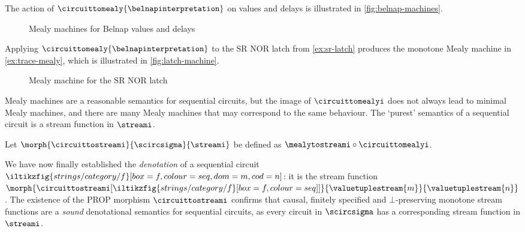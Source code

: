 \documentclass{lmcs}
\begin{document}
\begin{exa}
    The action of \(\circuittomealy{\belnapinterpretation}\) on values and
    delays is illustrated in
    \autoref{fig:belnap-machines}.
\end{exa}

\begin{figure}
    \centering
    

    \vspace{1em}

    
    \caption{
        Mealy machines for Belnap values and delays
    }
    \label{fig:belnap-machines}
\end{figure}

\begin{exa}\label{ex:mealy-translation}
    Applying \(\circuittomealy{\belnapinterpretation}\) to the SR NOR latch from
    \autoref{ex:sr-latch} produces the monotone Mealy machine in
    \autoref{ex:trace-mealy}, which is illustrated in \autoref{fig:latch-machine}.
\end{exa}

\begin{figure}
    \centering
    
    \caption{
        Mealy machine for the SR NOR latch
    }
    \label{fig:latch-machine}
\end{figure}

Mealy machines are a reasonable semantics for sequential circuits, but the
image of \(\circuittomealyi\) does not always lead to minimal Mealy machines,
and there are many Mealy machines that may correspond to the same behaviour.
The `purest' semantics of a sequential circuit is a stream function in
\(\streami\).

\begin{defi}
    Let \(\morph{\circuittostreami}{\scircsigma}{\streami}\) be defined as
    \(\mealytostreami \circ \circuittomealyi\).
\end{defi}

We have now finally established the \emph{denotation} of a sequential circuit \(
\iltikzfig{strings/category/f}[box=f,colour=seq,dom=m,cod=n]
\): it is the stream function \(
\morph{\circuittostreami[\iltikzfig{strings/category/f}[box=f,colour=seq]]}{\valuetuplestream{m}}{\valuetuplestream{n}}
\).
The existence of the PROP morphism \(\circuittostreami\) confirms that causal,
finitely specified and \(\bot\)-preserving monotone stream functions are a
\emph{sound} denotational semantics for sequential circuits, as every circuit in
\(\scircsigma\) has a corresponding stream function in \(\streami\).
\end{document}
